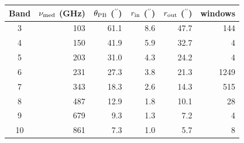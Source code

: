 \begin{tabular}{@{}crrrrr@{}}
\toprule
Band & $\nu_{\rm med}$ (GHz) & $\theta_{\rm PB}$ ($^{\prime\prime}$) & $r_{\rm in}$ ($^{\prime\prime}$) & $r_{\rm out}$ ($^{\prime\prime}$) & windows \\
\midrule
3 & 103 & 61.1 & 8.6 & 47.7 & 144 \\
4 & 150 & 41.9 & 5.9 & 32.7 & 4 \\
5 & 203 & 31.0 & 4.3 & 24.2 & 4 \\
6 & 231 & 27.3 & 3.8 & 21.3 & 1249 \\
7 & 343 & 18.3 & 2.6 & 14.3 & 515 \\
8 & 487 & 12.9 & 1.8 & 10.1 & 28 \\
9 & 679 & 9.3 & 1.3 & 7.2 & 4 \\
10 & 861 & 7.3 & 1.0 & 5.7 & 8 \\
\bottomrule
\end{tabular}
